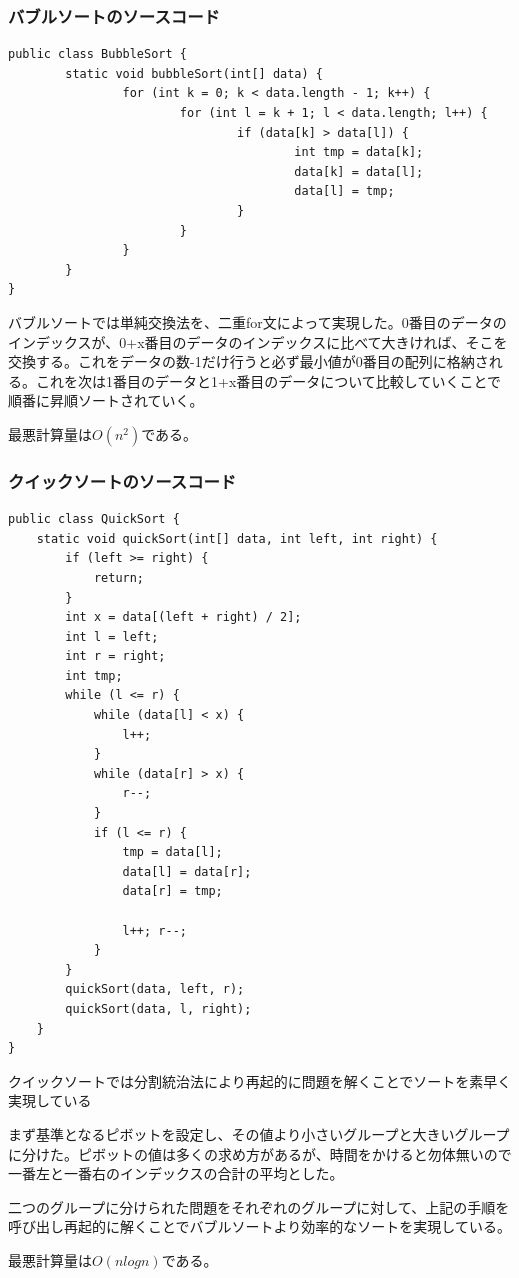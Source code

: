 \documentclass[a4j,dvipdfmx]{jsreport}
\begin{document}
\subsubsection{バブルソートのソースコード}
\lstset{caption=BubbleSort,firstnumber=1}
\begin{lstlisting}[style=source]
public class BubbleSort {
        static void bubbleSort(int[] data) {
                for (int k = 0; k < data.length - 1; k++) {
                        for (int l = k + 1; l < data.length; l++) {
                                if (data[k] > data[l]) {
                                        int tmp = data[k];
                                        data[k] = data[l];
                                        data[l] = tmp;
                                }
                        }
                }
        }
}
\end{lstlisting}

バブルソートでは単純交換法を、二重for文によって実現した。0番目のデータのインデックスが、0+x番目のデータのインデックスに比べて大きければ、そこを交換する。これをデータの数-1だけ行うと必ず最小値が0番目の配列に格納される。これを次は1番目のデータと1+x番目のデータについて比較していくことで順番に昇順ソートされていく。\par
最悪計算量は$O(n^2)$である。
\subsubsection{クイックソートのソースコード}
\lstset{caption=QuickSort,firstnumber=1}
\begin{lstlisting}[style=source]
public class QuickSort {
    static void quickSort(int[] data, int left, int right) {
        if (left >= right) {
            return;
        }
        int x = data[(left + right) / 2];
        int l = left;
        int r = right;
        int tmp;
        while (l <= r) {
            while (data[l] < x) {
                l++;
            }
            while (data[r] > x) {
                r--;
            }
            if (l <= r) {
                tmp = data[l];
                data[l] = data[r];
                data[r] = tmp;

                l++; r--;
            }
        }
        quickSort(data, left, r);
        quickSort(data, l, right);
    }
}
\end{lstlisting}

クイックソートでは分割統治法により再起的に問題を解くことでソートを素早く実現している\par
まず基準となるピボットを設定し、その値より小さいグループと大きいグループに分けた。ピボットの値は多くの求め方があるが、時間をかけると勿体無いので一番左と一番右のインデックスの合計の平均とした。\par
二つのグループに分けられた問題をそれぞれのグループに対して、上記の手順を呼び出し再起的に解くことでバブルソートより効率的なソートを実現している。\par
最悪計算量は$O(nlogn)$である。
\end{document}
